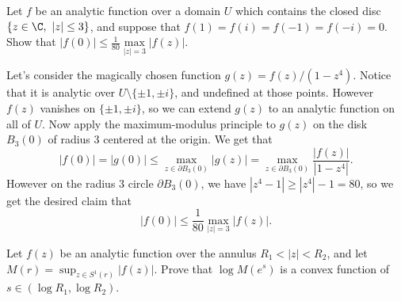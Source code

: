 \documentclass[11pt,letterpaper]{article}
\begin{document}
\begin{problem}
    Let $f$ be an analytic function over a domain $U$ which contains the closed disc $\{z\in\C,\ |z|\leq 3\}$, and suppose that $f(1)=f(i)=f(-1)=f(-i)=0$. Show that $\displaystyle |f(0)|\leq \frac{1}{80} \max\limits_{|z|=3} |f(z)|$.
\end{problem}

\begin{solution}
    Let's consider the magically chosen function $g(z)=f(z)/(1-z^4)$. Notice that it is analytic over $U\setminus \{\pm 1, \pm i\}$, and undefined at those points. However $f(z)$ vanishes on $\{\pm 1,\pm i\}$, so we can extend $g(z)$ to an analytic function on all of $U$. Now apply the maximum-modulus principle to $g(z)$ on the disk $B_3(0)$ of radius $3$ centered at the origin. We get that 
    \[
        |f(0)| = |g(0)| \leq \max_{z\in \partial B_3(0)} |g(z)| = \max_{z\in \partial B_3(0)} \frac{|f(z)|}{|1-z^4|}
    .\] 
    However on the radius $3$ circle $\partial B_3(0)$, we have $|z^4-1|\geq |z^4|-1=80$, so we get the desired claim that
    \[
        |f(0)|\leq \frac{1}{80}\max_{|z|=3} |f(z)|
    .\] 
\end{solution}

\begin{problem}
     Let $f(z)$ be an analytic function over the annulus $R_1<|z|<R_2$, and let $M(r)=\sup_{z\in S^1(r)} |f(z)|$. Prove that $\log M(e^s)$ is a convex function of $s\in (\log R_1,\log R_2)$. 
\end{problem}
\end{document}
